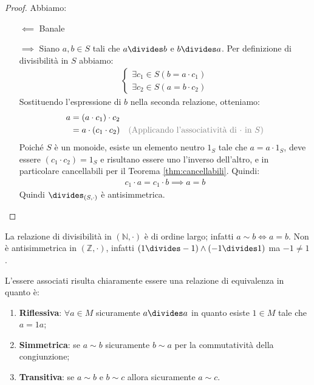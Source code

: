 \begin{proof}
Abbiamo:
	\begin{itemize}
		\item[$\impliedby$] Banale
		\item[$\implies$] Siano $a,b \in S$ tali che $a \divides b$ e $b \divides a$. Per definizione di divisibilità in $S$ abbiamo:
		\begin{align*}
			\begin{cases*}
				\exists c_{1} \in S (b = a \cdot c_{1})\\	
				\exists c_{2} \in S (a = b \cdot c_{2})
			\end{cases*}
		\end{align*}
		Sostituendo l'espressione di $b$ nella seconda relazione, otteniamo:
		\begin{align*}
			a &= (a \cdot c_{1}) \cdot c_{2}\\ 
			&= a \cdot(c_{1} \cdot c_{2}) & \text{\textcolor{gray}{(Applicando l'associatività di $\cdot$ in $S$)}} \\
		\end{align*}
		Poiché $S$ è un monoide, esiste un elemento neutro $1_{S}$ tale che $a = a \cdot 1_{S}$, deve essere $(c_{1} \cdot c_{2}) = 1_{S}$ e risultano essere uno l'inverso dell'altro, e in particolare cancellabili per il Teorema \ref{thm:cancellabili}. Quindi:
		\begin{align*}
			c_{1} \cdot a = c_{1} \cdot b \implies a=b
		\end{align*}
		Quindi $\divides_{(S,\cdot)}$ è antisimmetrica.
	\end{itemize}
\end{proof}

\begin{example}
	La relazione di divisibilità in $(\mathbb{N}, \cdot)$ è di ordine largo; infatti $a \sim b \iff a=b$. Non è antisimmetrica in $(\mathbb{Z}, \cdot)$, infatti $(1 \divides -1) \land (-1 \divides 1)$ ma $-1 \neq 1$.
\end{example}

L'essere associati risulta chiaramente essere una relazione di equivalenza in quanto è:
\begin{enumerate}
	\item \textbf{Riflessiva}: $\forall a \in M$ sicuramente $a \divides a$ in quanto esiste $1 \in M$ tale che $a = 1a$;
	\item \textbf{Simmetrica}: se $a \sim b$ sicuramente $b \sim a$ per la commutatività della congiunzione;
	\item \textbf{Transitiva}: se $a \sim b$ e $b \sim c$ allora sicuramente $a \sim c$.
\end{enumerate}

